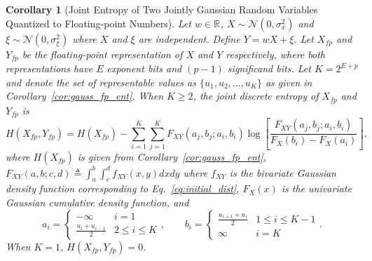 \documentclass[12pt,onecolumn, margin=1in]{IEEEtran}
\newtheorem{corollary}{Corollary}[theorem]
\newcommand{\bracket}[1]{\left[ #1 \right]}
\newcommand{\paren}[1]{\left( #1 \right)}
\newcommand{\R}[1]{\mathbb{R}^{#1}}
\newcommand{\gauss}[2]{\mathcal{N}\paren{#1, #2}}
\newcommand{\sigx}{\sigma_x}
\newcommand{\sigxi}{\sigma_\xi}
\newcommand{\Xfp}{X_{fp}}
\newcommand{\Yfp}{Y_{fp}}
\begin{document}
\begin{corollary}[Joint Entropy of Two Jointly Gaussian Random Variables Quantized to Floating-point Numbers]\label{cor:joint_ent}
    Let $w \in \R{}$, $X \sim \gauss{0}{\sigx^2}$ and $\xi \sim \gauss{0}{\sigxi^2}$ where $X$ and $\xi$ are independent. Define $Y = wX + \xi$. Let $X_{fp}$ and $Y_{fp}$ be the floating-point representation of $X$ and $Y$ respectively, where both representations have $E$ exponent bits and $(p-1)$ significand bits. Let $K = 2^{E+p}$ and denote the set of representable values as $\{u_1, u_2, \dots, u_K\}$ as given in Corollary~\ref{cor:gauss_fp_ent}. When $K \geq 2$, the joint discrete entropy of $X_{fp}$ and $Y_{fp}$ is
    \begin{equation*}
        H(X_{fp}, Y_{fp}) = H(\Xfp) - \sum_{i = 1}^{K}\sum_{j = 1}^{K} F_{XY}\paren{a_j, b_j; a_i, b_i}\log\bracket{\frac{F_{XY}\paren{a_j, b_j; a_i, b_i}}{F_X(b_i) - F_X(a_i)}}.
    \end{equation*}
where $H(\Xfp)$ is given from Corollary~\ref{cor:gauss_fp_ent}, $F_{XY}(a, b; c,d) \triangleq \int_a^b\int_c^d f_{XY}(x,y)dxdy$ where $f_{XY}$ is the bivariate Gaussian density function corresponding to Eq.~\eqref{eq:initial_dist}, $F_X(x)$ is the univariate Gaussian cumulative density function, and \begin{equation*}
    a_i = \begin{cases} -\infty & i = 1 \\ \frac{u_i + u_{i-1}}{2} & 2 \leq i \leq K\end{cases}, \qquad b_i =\begin{cases} \frac{u_{i+1}+u_i}{2} & 1 \leq i \leq K-1 \\ \infty & i = K\end{cases}. 
    \end{equation*} When $K = 1$, $H(\Xfp, \Yfp) = 0$.
\end{corollary}
\end{document}
